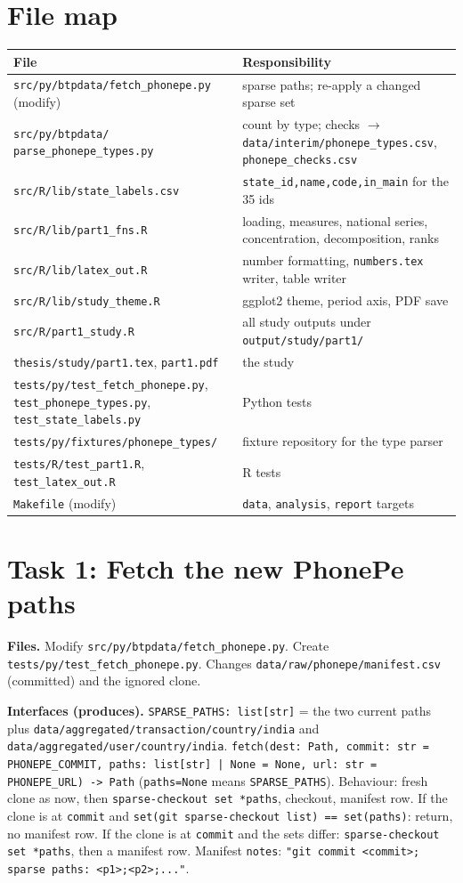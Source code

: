 \documentclass[10pt,a4paper]{article}
\newcommand{\f}[1]{\texttt{#1}}
\begin{document}
\section*{File map}
\par\noindent\begin{tabularx}{\textwidth}{@{}>{\raggedright\arraybackslash}p{} Y@{}}
\toprule
File & Responsibility \\
\midrule
\f{src/py/btpdata/fetch\_phonepe.py} (modify) & sparse paths; re-apply a changed sparse set \\
\f{src/py/btpdata/} \f{parse\_phonepe\_types.py} & count by type; checks $\to$ \f{data/interim/phonepe\_types.csv},
  \f{phonepe\_checks.csv} \\
\f{src/R/lib/state\_labels.csv} & \f{state\_id,name,code,in\_main} for the 35 ids \\
\f{src/R/lib/part1\_fns.R} & loading, measures, national series, concentration, decomposition, ranks \\
\f{src/R/lib/latex\_out.R} & number formatting, \f{numbers.tex} writer, table writer \\
\f{src/R/lib/study\_theme.R} & ggplot2 theme, period axis, PDF save \\
\f{src/R/part1\_study.R} & all study outputs under \f{output/study/part1/} \\
\f{thesis/study/part1.tex}, \f{part1.pdf} & the study \\
\f{tests/py/test\_fetch\_phonepe.py}, \f{test\_phonepe\_types.py}, \f{test\_state\_labels.py} & Python tests \\
\f{tests/py/fixtures/phonepe\_types/} & fixture repository for the type parser \\
\f{tests/R/test\_part1.R}, \f{test\_latex\_out.R} & R tests \\
\f{Makefile} (modify) & \f{data}, \f{analysis}, \f{report} targets \\
\bottomrule
\end{tabularx}

\section{Task 1: Fetch the new PhonePe paths}
\textbf{Files.} Modify \f{src/py/btpdata/fetch\_phonepe.py}. Create \f{tests/py/test\_fetch\_phonepe.py}.
Changes \f{data/raw/phonepe/manifest.csv} (committed) and the ignored clone.

\textbf{Interfaces (produces).}
\f{SPARSE\_PATHS: list[str]} = the two current paths plus \f{data/aggregated/transaction/country/india} and
\f{data/aggregated/user/country/india}.
\f{fetch(dest: Path, commit: str = PHONEPE\_COMMIT, paths: list[str] | None = None, url: str = PHONEPE\_URL) -> Path}
(\f{paths=None} means \f{SPARSE\_PATHS}).
Behaviour: fresh clone as now, then \f{sparse-checkout set *paths}, checkout, manifest row. If the clone is at
\f{commit} and \f{set(git sparse-checkout list) == set(paths)}: return, no manifest row. If the clone is at
\f{commit} and the sets differ: \f{sparse-checkout set *paths}, then a manifest row. Manifest \f{notes}:
\f{"git commit <commit>; sparse paths: <p1>;<p2>;..."}.
\end{document}
